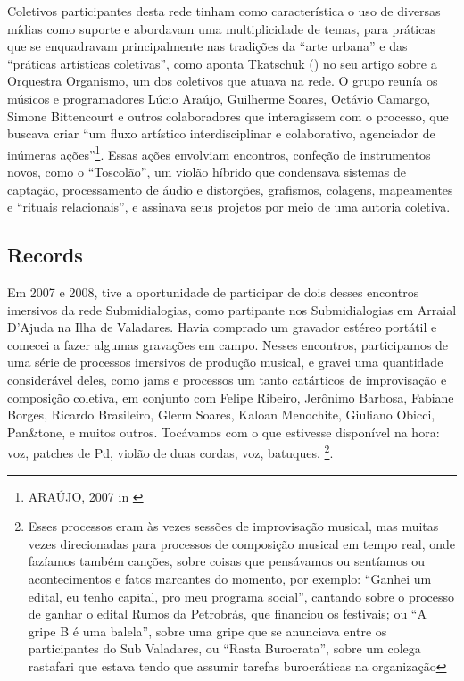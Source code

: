 Coletivos participantes desta rede tinham como característica o uso de diversas mídias como suporte e abordavam uma multiplicidade de temas, para práticas que se enquadravam principalmente nas tradições da ``arte urbana'' e das ``práticas artísticas coletivas'', como aponta Tkatschuk (\citeyear{Tkatschuk2011}) no seu artigo sobre a Orquestra Organismo, um dos coletivos que atuava na rede. O grupo reunía os músicos e programadores Lúcio Araújo, Guilherme Soares, Octávio Camargo, Simone Bittencourt e outros colaboradores que interagissem com o processo, que buscava criar ``um fluxo artístico interdisciplinar e colaborativo, agenciador de inúmeras ações''\footnote{ARAÚJO, 2007 in \cite{Tkatschuk2011}}. Essas ações envolviam encontros, confeção de instrumentos novos, como o ``Toscolão'', um violão híbrido que condensava sistemas de captação, processamento de áudio e distorções, grafismos, colagens, mapeamentes e ``rituais relacionais'', e assinava seus projetos por meio de uma autoria coletiva. 



\subsection{Records}
Em 2007 e 2008, tive a oportunidade de participar de dois desses encontros imersivos da rede Submidialogias, como partipante nos Submidialogias em Arraial D'Ajuda na Ilha de Valadares. Havia comprado um gravador estéreo portátil e comecei a fazer algumas gravações em campo. Nesses encontros, participamos de uma série de processos imersivos de produção musical, e gravei uma quantidade considerável deles, como jams e processos um tanto catárticos de improvisação e composição coletiva, em conjunto com Felipe Ribeiro, Jerônimo Barbosa, Fabiane Borges, Ricardo Brasileiro, Glerm Soares, Kaloan Menochite, Giuliano Obicci, Pan\&tone, e muitos outros. Tocávamos com o que estivesse disponível na hora: voz, patches de Pd, violão de duas cordas, voz, batuques. \footnote{Esses processos eram às vezes sessões de improvisação musical, mas muitas vezes direcionadas para processos de composição musical em tempo real, onde fazíamos também canções, sobre coisas que pensávamos ou sentíamos ou acontecimentos e fatos marcantes do momento, por exemplo: ``Ganhei um edital, eu tenho capital, pro meu programa social'', cantando sobre o processo de ganhar o edital Rumos da Petrobrás, que financiou os festivais; ou ``A gripe B é uma balela'', sobre uma gripe que se anunciava entre os participantes do Sub Valadares, ou ``Rasta Burocrata'', sobre um colega rastafari que estava tendo que assumir tarefas burocráticas na organização}.


